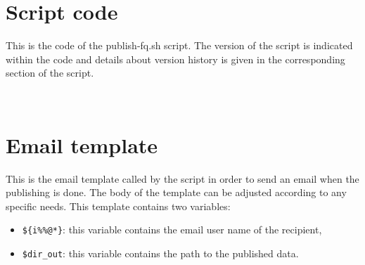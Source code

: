 \documentclass[11pt]{report}
\begin{document}
 \section{Script code}

This is the code of the publish-fq.sh script. The version of the script is indicated within the code and details about version history is given in the corresponding section of the script.

~\\

 \section{Email template}

This is the email template called by the script in order to send an email when the publishing is done. The body of the template can be adjusted according to any specific needs. This template contains two variables:
\begin{itemize}
	\item \verb|${i%%@*}|: this variable contains the email user name of the recipient,
	\item \verb|$dir_out|: this variable contains the path to the published data.
\end{itemize}

%

~\\

~\\
\end{document}
